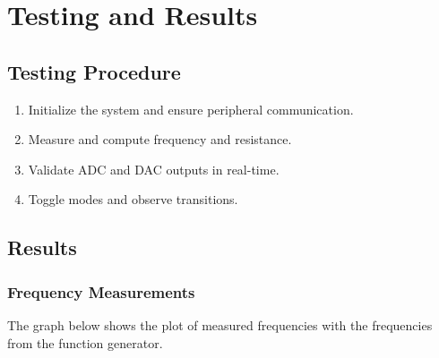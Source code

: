 \documentclass[12pt]{article}
\begin{document}
\section{Testing and Results}
\subsection{Testing Procedure}
\begin{enumerate}[leftmargin=2em]
    \item Initialize the system and ensure peripheral communication.
    \item Measure and compute frequency and resistance.
    \item Validate ADC and DAC outputs in real-time.
    \item Toggle modes and observe transitions.
\end{enumerate}

\subsection{Results}

\subsubsection{Frequency Measurements}

The graph below shows the plot of measured frequencies with the frequencies from the function generator.
\end{document}
